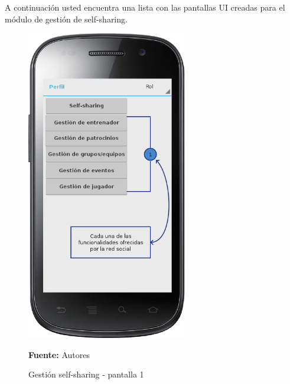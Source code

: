 A continuación usted encuentra una lista con las pantallas UI creadas para el módulo de gestión de self-sharing.

\begin{figure}[!htb]
  \begin{center}
    \includegraphics[width=7cm]{./imagenes/UI/Self_sharing/self_sharing_1.png}
    \caption{Gestión self-sharing - pantalla 1}
    \label{fig:self_sharing_1}
    \textbf{Fuente:}  Autores
  \end{center}
\end{figure}


